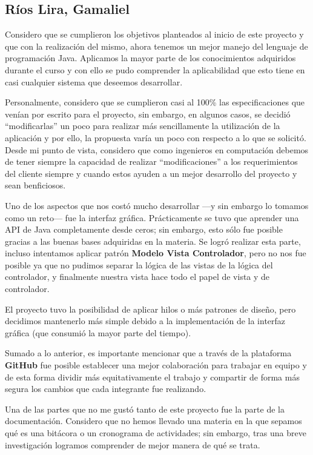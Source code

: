\newpage

\subsection*{Ríos Lira, Gamaliel}
Considero que se cumplieron los objetivos planteados al inicio de este proyecto y que con la realización del 
mismo, ahora tenemos un mejor manejo del lenguaje de programación Java. Aplicamos la mayor parte de los conocimientos 
adquiridos durante el curso y con ello se pudo comprender la aplicabilidad que esto tiene en casi cualquier sistema 
que deseemos desarrollar.

Personalmente, considero que se cumplieron casi al 100\% las especificaciones que venían por escrito para el proyecto, 
sin embargo, en algunos casos, se decidió ``modificarlas'' un poco para realizar más sencillamente la utilización de la 
aplicación y por ello, la propuesta varía un poco con respecto a lo que se solicitó. Desde mi punto de vista, considero 
que como ingenieros en computación debemos de tener siempre la capacidad de realizar ``modificaciones'' a los 
requerimientos del cliente siempre y cuando estos ayuden a un mejor desarrollo del proyecto y sean benficiosos.

Uno de los aspectos que nos costó mucho desarrollar ---y sin embargo lo tomamos como un reto--- fue la interfaz gráfica. 
Prácticamente se tuvo que aprender una API de Java completamente desde ceros; sin embargo, esto sólo fue posible gracias 
a las buenas bases adquiridas en la materia. Se logró realizar esta parte, incluso intentamos aplicar patrón \textbf{Modelo 
Vista Controlador}, pero no nos fue posible ya que no pudimos separar la lógica de las vistas de la lógica del controlador, 
y finalmente nuestra vista hace todo el papel de vista y de controlador.

El proyecto tuvo la posibilidad de aplicar hilos o más patrones de diseño, pero decidimos mantenerlo más simple debido a la 
implementación de la interfaz gráfica (que consumió la mayor parte del tiempo).

Sumado a lo anterior, es importante mencionar que a través de la plataforma \textbf{GitHub} fue posible establecer una mejor 
colaboración para trabajar en equipo y de esta forma dividir más equitativamente el trabajo y compartir de forma más segura 
los cambios que cada integrante fue realizando.

Una de las partes que no me gustó tanto de este proyecto fue la parte de la documentación. Considero que no hemos llevado 
una materia en la que sepamos qué es una bitácora o un cronograma de actividades; sin embargo, tras una breve investigación 
logramos comprender de mejor manera de qué se trata.